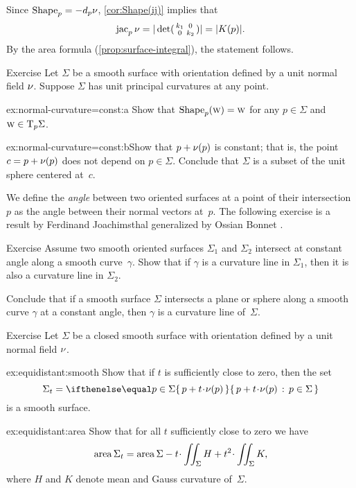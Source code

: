 Since $\mathop{\rm Shape}\nolimits_p=-d_p\nu$, \ref{cor:Shape(ij)} implies that
\[\mathop{\rm jac}\nolimits_p\nu=|\det(\begin{smallmatrix}
 k_1
 &0
 \\
 0
 &k_2
 \end{smallmatrix})|=|K(p)|.\]
By the area formula (\ref{prop:surface-integral}), the statement follows.
\qeds


\begin{thm}{Exercise}\label{ex:normal-curvature=const}
Let $\Sigma$ be a smooth surface with orientation defined by a unit normal field $\nu$.
Suppose $\Sigma$ has unit principal curvatures at any point.

\begin{subthm}{ex:normal-curvature=const:a} Show that $\mathop{\rm Shape}\nolimits_p(\text{\sc{w}})=\text{\sc{w}}$ for any $p\in\Sigma$ and $\text{\sc{w}}\in \mathrm{T}_p\Sigma$.
\end{subthm}

\begin{subthm}{ex:normal-curvature=const:b}Show that $p+\nu(p)$ is constant; that is, the point $c=p+\nu(p)$ does not depend on $p\in\Sigma$.
Conclude that $\Sigma$ is a subset of the unit sphere centered at~$c$.
\end{subthm}

\end{thm}

We define the {}\emph{angle} between two oriented surfaces at a point of their intersection $p$ as the angle between their normal vectors at~$p$.
The following exercise is a result by Ferdinand Joachimsthal \cite{joachimsthal} generalized by Ossian Bonnet \cite{bonnet}.

\begin{thm}{Exercise}\label{ex:shape-curvature-line}
Assume two smooth oriented surfaces $\Sigma_1$ and $\Sigma_2$ intersect at constant angle along a smooth curve~$\gamma$.
Show that if $\gamma$ is a curvature line in $\Sigma_1$, then it is also a curvature line in $\Sigma_2$.

Conclude that if a smooth surface $\Sigma$ intersects a plane or sphere along a smooth curve $\gamma$ at a constant angle,
then $\gamma$ is a curvature line of~$\Sigma$.
\end{thm}

\begin{thm}{Exercise}\label{ex:equidistant}
Let $\Sigma$ be a closed smooth surface with orientation defined by a unit normal field $\nu$.

\begin{subthm}{ex:equidistant:smooth}
Show that if $t$ is sufficiently close to zero, then the set 
\[\Sigma_t=\set{p+t\cdot \Norm(p)}{p\in\Sigma}\] 
is a smooth surface.
\end{subthm}

\begin{subthm}{ex:equidistant:area}
Show that for all $t$ sufficiently close to zero we have
\[\area\Sigma_t=\area\Sigma-t\cdot \iint_\Sigma H+t^2\cdot \iint_\Sigma K,\]
where $H$ and $K$ denote mean and Gauss curvature of~$\Sigma$.
\end{subthm}



\end{thm}

